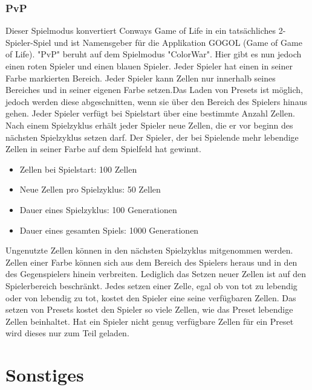 \documentclass[12pt]{article}
\theoremstyle{plain}
\begin{document}
\subsubsection{PvP}
Dieser Spielmodus konvertiert Conways Game of Life in ein tatsächliches 2-Spieler-Spiel und ist Namensgeber für die Applikation GOGOL (Game of Game of Life). "PvP" beruht auf dem Spielmodus "ColorWar". Hier gibt es nun jedoch einen roten Spieler und einen blauen Spieler. Jeder Spieler hat einen in seiner Farbe markierten Bereich. Jeder Spieler kann Zellen nur innerhalb seines Bereiches und in seiner eigenen Farbe setzen.Das Laden von Presets ist möglich, jedoch werden diese abgeschnitten, wenn sie über den Bereich des Spielers hinaus gehen. Jeder Spieler verfügt bei Spielstart über eine bestimmte Anzahl Zellen. Nach einem Spielzyklus erhält jeder Spieler neue Zellen, die er vor beginn des nächsten Spielzyklus setzen darf. Der Spieler, der bei Spielende mehr lebendige Zellen in seiner Farbe auf dem Spielfeld hat gewinnt.
\begin{itemize}
\item
Zellen bei Spielstart: 100 Zellen
\item
Neue Zellen pro Spielzyklus: 50 Zellen
\item
Dauer eines Spielzyklus: 100 Generationen
\item
Dauer eines gesamten Spiels: 1000 Generationen
\end{itemize}
Ungenutzte Zellen können in den nächsten Spielzyklus mitgenommen werden. Zellen einer Farbe können sich aus dem Bereich des Spielers heraus und in den des Gegenspielers hinein verbreiten. Lediglich das Setzen neuer Zellen ist auf den Spielerbereich beschränkt. Jedes setzen einer Zelle, egal ob von tot zu lebendig oder von lebendig zu tot, kostet den Spieler eine seine verfügbaren Zellen. Das setzen von Presets kostet den Spieler so viele Zellen, wie das Preset lebendige Zellen beinhaltet. Hat ein Spieler nicht genug verfügbare Zellen für ein Preset wird dieses nur zum Teil geladen.

\section{Sonstiges}
\end{document}
